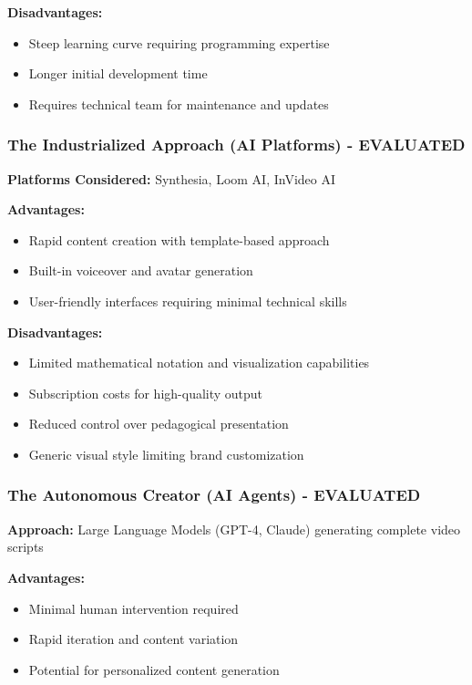 \documentclass[12pt,a4paper]{article}
\begin{document}
\textbf{Disadvantages:}
\begin{itemize}
    \item Steep learning curve requiring programming expertise
    \item Longer initial development time
    \item Requires technical team for maintenance and updates
\end{itemize}

\subsubsection{The Industrialized Approach (AI Platforms) - EVALUATED}
\textbf{Platforms Considered:} Synthesia, Loom AI, InVideo AI

\textbf{Advantages:}
\begin{itemize}
    \item Rapid content creation with template-based approach
    \item Built-in voiceover and avatar generation
    \item User-friendly interfaces requiring minimal technical skills
\end{itemize}

\textbf{Disadvantages:}
\begin{itemize}
    \item Limited mathematical notation and visualization capabilities
    \item Subscription costs for high-quality output
    \item Reduced control over pedagogical presentation
    \item Generic visual style limiting brand customization
\end{itemize}

\subsubsection{The Autonomous Creator (AI Agents) - EVALUATED}
\textbf{Approach:} Large Language Models (GPT-4, Claude) generating complete video scripts

\textbf{Advantages:}
\begin{itemize}
    \item Minimal human intervention required
    \item Rapid iteration and content variation
    \item Potential for personalized content generation
\end{itemize}
\end{document}
